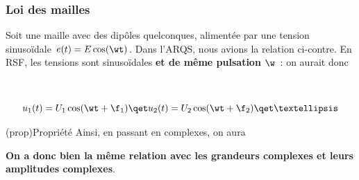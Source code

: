 \documentclass[../../main/main.tex]{subfiles}
\begin{document}
\subsubsection{Loi des mailles}
\noindent
\begin{minipage}[t]{.48\linewidth}
	Soit une maille avec des dipôles quelconques, alimentée par une tension
	sinusoïdale $e(t) = E\cos(\wt)$. Dans l'ARQS, nous avions la relation ci-contre.
	En RSF, les tensions sont sinusoïdales \textbf{et de même pulsation} $\w$~: on
	aurait donc
\end{minipage}
\hfill
\begin{minipage}[t]{.48\linewidth}
	~
	\vspace{-40pt}
	\begin{center}
	\end{center}
\end{minipage}
\[
	u_1(t) = U_1\cos(\wt+\f_1)
	\qet
	u_2(t) = U_2\cos(\wt+\f_2)
	\qet
	…
\]

\begin{tcb}(prop){Propriété}
	Ainsi, en passant en complexes, on aura
	\begin{center}
		\textbf{On a donc bien la même relation avec les grandeurs complexes et
			leurs amplitudes complexes}.
	\end{center}
\end{tcb}
\end{document}
